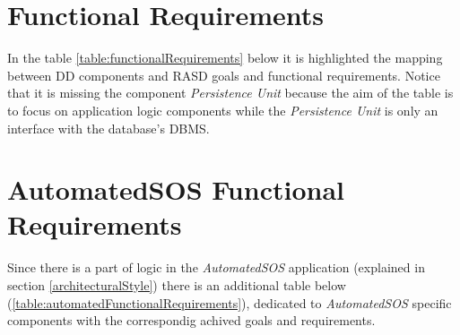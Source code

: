 \section{Functional Requirements}
In the table \ref{table:functionalRequirements} below it is highlighted the mapping between DD components and RASD goals and functional requirements. Notice that it is missing the component \textit{Persistence Unit} because the aim of the table is to focus on application logic components while the \textit{Persistence Unit} is only an interface with the database's DBMS.

\section{AutomatedSOS Functional Requirements}
Since there is a part of logic in the \textit{AutomatedSOS} application (explained in section \ref{architecturalStyle}) there is an additional table below (\ref{table:automatedFunctionalRequirements}), dedicated to \textit{AutomatedSOS} specific components with the correspondig achived goals and requirements.

